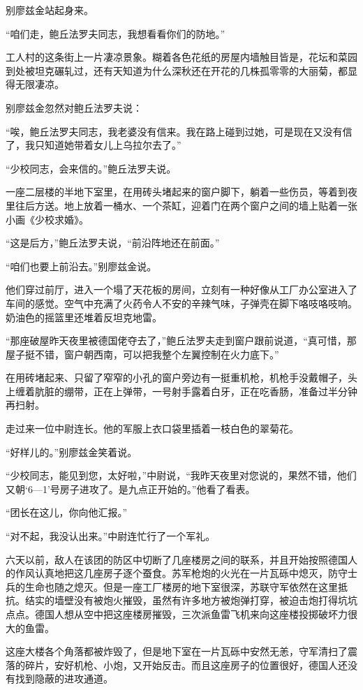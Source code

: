 别廖兹金站起身来。

“咱们走，鲍丘法罗夫同志，我想看看你们的防地。”

工人村的这条街上一片凄凉景象。糊着各色花纸的房屋内墙触目皆是，花坛和菜园到处被坦克碾轧过，还有天知道为什么深秋还在开花的几株孤零零的大丽菊，都显得无限凄凉。

别廖兹金忽然对鲍丘法罗夫说：

“唉，鲍丘法罗夫同志，我老婆没有信来。我在路上碰到过她，可是现在又没有信了，我只知道她带着女儿上乌拉尔去了。”

“少校同志，会来信的。”鲍丘法罗夫说。

一座二层楼的半地下室里，在用砖头堵起来的窗户脚下，躺着一些伤员，等着到夜里往后方送。地上放着一桶水、一个茶缸，迎着门在两个窗户之间的墙上贴着一张小画《少校求婚》。

“这是后方，”鲍丘法罗夫说，“前沿阵地还在前面。”

“咱们也要上前沿去。”别廖兹金说。

他们穿过前厅，进入一个塌了天花板的房间，立刻有一种好像从工厂办公室进入了车间的感觉。空气中充满了火药令人不安的辛辣气味，子弹壳在脚下咯吱咯吱响。奶油色的摇篮里还堆着反坦克地雷。

“那座破屋昨天夜里被德国佬夺去了，”鲍丘法罗夫走到窗户跟前说道，“真可惜，那屋子挺不错，窗户朝西南，可以把我整个左翼控制在火力底下。”

在用砖堵起来、只留了窄窄的小孔的窗户旁边有一挺重机枪，机枪手没戴帽子，头上缠着肮脏的绷带，正在上弹带，一号射手露着白牙，正在吃香肠，准备过半分钟再扫射。

走过来一位中尉连长。他的军服上衣口袋里插着一枝白色的翠菊花。

“好样儿的。”别廖兹金笑着说。

“少校同志，能见到您，太好啦，”中尉说，“我昨天夜里对您说的，果然不错，他们又朝‘6—1’号房子进攻了。是九点正开始的。”他看了看表。

“团长在这儿，你向他汇报。”

“对不起，我没认出来。”中尉连忙行了一个军礼。

六天以前，敌人在该团的防区中切断了几座楼房之间的联系，并且开始按照德国人的作风认真地把这几座房子逐个蚕食。苏军枪炮的火光在一片瓦砾中熄灭，防守士兵的生命也随之熄灭。但是一座工厂楼房的地下室很深，苏联守军依然在这里抵抗。结实的墙壁没有被炮火摧毁，虽然有许多地方被炮弹打穿，被迫击炮打得坑坑点点。德国人想从空中把这座楼房摧毁，三次派鱼雷飞机来向这座楼投掷破坏力很大的鱼雷。

这座大楼各个角落都被炸毁了，但是地下室在一片瓦砾中安然无恙，守军清扫了震落的碎片，安好机枪、小炮，又开始反击。而且这座房子的位置很好，德国人还没有找到隐蔽的进攻通道。

